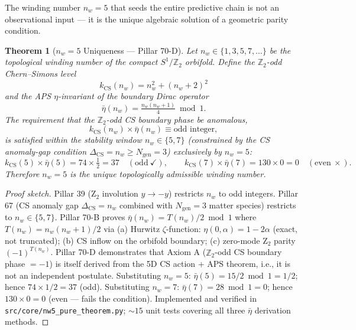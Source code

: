 \documentclass[12pt,a4paper]{article}
\newtheorem{theorem}{Theorem}[section]
\begin{document}
The winding number $n_w = 5$ that seeds the entire predictive chain is not
an observational input — it is the unique algebraic solution of a geometric
parity condition.

\begin{theorem}[$n_w = 5$ Uniqueness — Pillar 70-D]
  \label{thm:nw5}
  Let $n_w \in \{1, 3, 5, 7, \ldots\}$ be the topological winding number of
  the compact $S^1/\mathbb{Z}_2$ orbifold.  Define the $\mathbb{Z}_2$-odd
  Chern--Simons level
  \begin{equation}
    k_\mathrm{CS}(n_w) = n_w^2 + (n_w+2)^2
  \end{equation}
  and the APS $\eta$-invariant of the boundary Dirac operator
  \begin{equation}
    \bar\eta(n_w) = \tfrac{n_w(n_w+1)}{4} \bmod 1 .
  \end{equation}
  The requirement that the $\mathbb{Z}_2$-odd CS boundary phase be anomalous,
  \begin{equation}
    k_\mathrm{CS}(n_w) \times \bar\eta(n_w) \equiv \text{odd integer},
    \label{eq:nw5-condition}
  \end{equation}
  is satisfied within the stability window $n_w \in \{5, 7\}$ (constrained by
  the CS anomaly-gap condition $\Delta_\mathrm{CS} = n_w \geq N_\mathrm{gen} = 3$)
  exclusively by $n_w = 5$:
  \begin{equation}
    k_\mathrm{CS}(5) \times \bar\eta(5) = 74 \times \tfrac{1}{2} = 37 \quad
    (\text{odd}\ \checkmark), \qquad
    k_\mathrm{CS}(7) \times \bar\eta(7) = 130 \times 0 = 0 \quad
    (\text{even}\ \times).
  \end{equation}
  Therefore $n_w = 5$ is the unique topologically admissible winding number.
\end{theorem}

\begin{proof}[Proof sketch]
  Pillar 39 (Z$_2$ involution $y \to -y$) restricts $n_w$ to odd integers.
  Pillar 67 (CS anomaly gap $\Delta_\mathrm{CS} = n_w$ combined with $N_\mathrm{gen} = 3$
  matter species) restricts to $n_w \in \{5, 7\}$.
  Pillar 70-B proves $\bar\eta(n_w) = T(n_w)/2 \bmod 1$ where $T(n_w) =
  n_w(n_w+1)/2$ via (a) Hurwitz $\zeta$-function: $\eta(0,\alpha) = 1 - 2\alpha$
  (exact, not truncated); (b) CS inflow on the orbifold boundary; (c) zero-mode
  Z$_2$ parity $(-1)^{T(n_w)}$.
  Pillar 70-D demonstrates that Axiom A ($\mathbb{Z}_2$-odd CS boundary phase
  $= -1$) is itself derived from the 5D CS action + APS theorem, i.e., it is not
  an independent postulate.
  Substituting $n_w = 5$: $\bar\eta(5) = 15/2 \bmod 1 = 1/2$; hence
  $74 \times 1/2 = 37$ (odd).  Substituting $n_w = 7$: $\bar\eta(7) = 28 \bmod 1
  = 0$; hence $130 \times 0 = 0$ (even — fails the condition).
  Implemented and verified in \texttt{src/core/nw5\_pure\_theorem.py};
  $\sim 15$ unit tests covering all three $\bar\eta$ derivation methods.
\end{proof}
\end{document}
